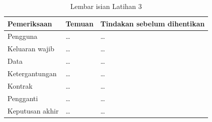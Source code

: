\begin{table}[!htb]
  \centering
  \caption{Lembar isian Latihan 3}
  \label{tab:ch09-lat3-hasil}
  \small
  \begin{tabularx}{\textwidth}{lXX}
    \hline
    \textbf{Pemeriksaan} & \textbf{Temuan} & \textbf{Tindakan sebelum dihentikan} \\
    \hline
    Pengguna & \dots & \dots \\
    \hline
    Keluaran wajib & \dots & \dots \\
    \hline
    Data & \dots & \dots \\
    \hline
    Ketergantungan & \dots & \dots \\
    \hline
    Kontrak & \dots & \dots \\
    \hline
    Pengganti & \dots & \dots \\
    \hline
    Keputusan akhir & \dots & \dots \\
    \hline
  \end{tabularx}
\end{table}

